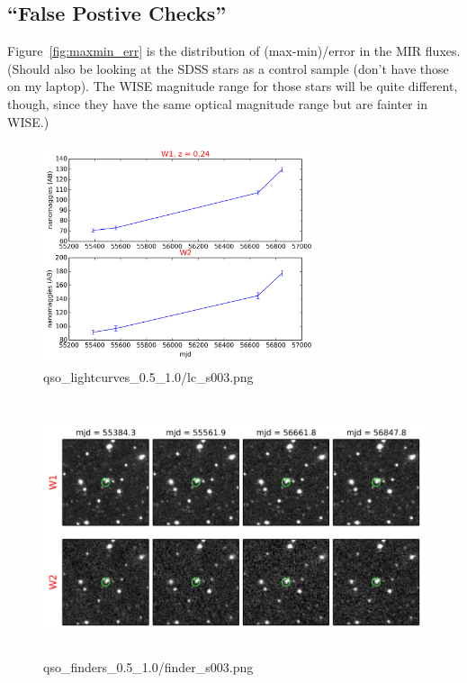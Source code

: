 \documentclass{emulateapj}
\begin{document}
\subsection{``False Postive Checks''}
Figure~\ref{fig:maxmin_err} is the distribution of (max-min)/error in
the MIR fluxes.  (Should also be looking at the SDSS stars as a
control sample (don’t have those on my laptop).  The WISE magnitude
range for those stars will be quite different, though, since they have
the same optical magnitude range but are fainter in WISE.)



\begin{figure}
    \includegraphics[width=8.00cm, height=6.50cm, 
    trim=0.0cm 0.0cm 0.0cm 0.0cm, clip]
    {lc_s003.png}
    \centering
    \caption[]{qso\_lightcurves\_0.5\_1.0/lc\_s003.png}
    \label{fig:lc_s003}
\end{figure}
  
\begin{figure}
    \includegraphics[width=14.00cm, height=7.50cm, 
    trim=0.0cm 0.0cm 0.0cm 0.0cm, clip] 
    {finder_s003.png}
    \centering
    \caption[]{qso\_finders\_0.5\_1.0/finder\_s003.png}
    \label{fig:finder_s003}
\end{figure}
\end{document}
